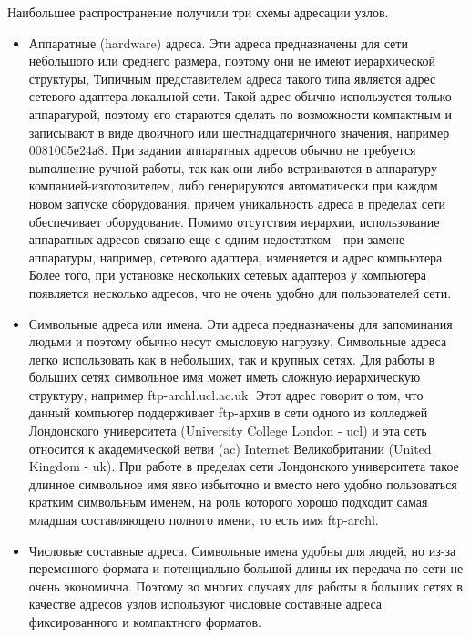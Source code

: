 Наибольшее распространение получили три схемы адресации узлов.
\begin{itemize}
    \item Аппаратные (hardware) адреса.
        Эти адреса предназначены для сети небольшого или среднего размера, поэтому они не имеют иерархической структуры, Типичным представителем адреса такого типа является адрес сетевого адаптера локальной сети.
        Такой адрес обычно используется только аппаратурой, поэтому его стараются сделать по возможности компактным и записывают в виде двоичного или шестнадцатеричного значения, например 0081005е24а8.
        При задании аппаратных адресов обычно не требуется выполнение ручной работы, так как они либо встраиваются в аппаратуру компанией-изготовителем, либо генерируются автоматически при каждом новом запуске оборудования, причем уникальность адреса в пределах сети обеспечивает оборудование.
        Помимо отсутствия иерархии, использование аппаратных адресов связано еще с одним недостатком - при замене аппаратуры, например, сетевого адаптера, изменяется и адрес компьютера.
        Более того, при установке нескольких сетевых адаптеров у компьютера появляется несколько адресов, что не очень удобно для пользователей сети.
    \item Символьные адреса или имена.
        Эти адреса предназначены для запоминания людьми и поэтому обычно несут смысловую нагрузку.
        Символьные адреса легко использовать как в небольших, так и крупных сетях.
        Для работы в больших сетях символьное имя может иметь сложную иерархическую структуру, например ftp-archl.ucl.ac.uk.
        Этот адрес говорит о том, что данный компьютер поддерживает ftp-архив в сети одного из колледжей Лондонского университета (University College London - ucl) и эта сеть относится к академической ветви (ac) Internet Великобритании (United Kingdom - uk).
        При работе в пределах сети Лондонского университета такое длинное символьное имя явно избыточно и вместо него удобно пользоваться кратким символьным именем, на роль которого хорошо подходит самая младшая составляющего полного имени, то есть имя ftp-archl.
    \item Числовые составные адреса.
        Символьные имена удобны для людей, но из-за переменного формата и потенциально большой длины их передача по сети не очень экономична.
        Поэтому во многих случаях для работы в больших сетях в качестве адресов узлов используют числовые составные адреса фиксированного и компактного форматов.
\end{itemize}

